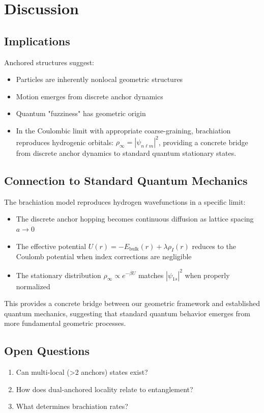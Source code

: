 \documentclass[11pt]{article}
\theoremstyle{plain}
\theoremstyle{definition}
\begin{document}
\section{Discussion}
\label{sec:discussion}

\subsection{Implications}
Anchored structures suggest:
\begin{itemize}
  \item Particles are inherently nonlocal geometric structures
  \item Motion emerges from discrete anchor dynamics
  \item Quantum "fuzziness" has geometric origin
  \item In the Coulombic limit with appropriate coarse-graining, brachiation reproduces hydrogenic orbitals: $\rho_\infty=|\psi_{n\ell m}|^2$, providing a concrete bridge from discrete anchor dynamics to standard quantum stationary states.
\end{itemize}

\subsection{Connection to Standard Quantum Mechanics}
The brachiation model reproduces hydrogen wavefunctions in a specific limit:
\begin{itemize}
  \item The discrete anchor hopping becomes continuous diffusion as lattice spacing $a \to 0$
  \item The effective potential $U(r) = -E_{\text{bulk}}(r) + \lambda\rho_I(r)$ reduces to the Coulomb potential when index corrections are negligible
  \item The stationary distribution $\rho_\infty \propto e^{-\beta U}$ matches $|\psi_{1s}|^2$ when properly normalized
\end{itemize}
This provides a concrete bridge between our geometric framework and established quantum mechanics, suggesting that standard quantum behavior emerges from more fundamental geometric processes.

\subsection{Open Questions}
\begin{enumerate}
  \item Can multi-local (>2 anchors) states exist?
  \item How does dual-anchored locality relate to entanglement?
  \item What determines brachiation rates?
\end{enumerate}
\end{document}
